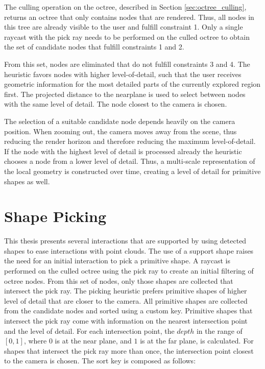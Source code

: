 \par

The culling operation on the octree, described in Section \ref{sec:octree_culling}, returns an octree that only contains nodes that are rendered. Thus, all nodes in this tree are already visible to the user and fulfill constraint 1. Only a single raycast with the pick ray needs to be performed on the culled octree to obtain the set of candidate nodes that fulfill constraints 1 and 2. 

\par

From this set, nodes are eliminated that do not fulfill constraints 3 and 4. The heuristic favors nodes with higher level-of-detail, such that the user receives geometric information for the most detailed parts of the currently explored region first. The projected distance to the nearplane is used to select between nodes with the same level of detail. The node closest to the camera is chosen. 

\par

The selection of a suitable candidate node depends heavily on the camera position. When zooming out, the camera moves away from the scene, thus reducing the render horizon and therefore reducing the maximum level-of-detail. If the node with the highest level of detail is processed already the heuristic chooses a node from a lower level of detail. Thus, a multi-scale representation of the local geometry is constructed over time, creating a level of detail for primitive shapes as well. 


\section{Shape Picking}
\label{sec:shapePicking}

This thesis presents several interactions that are supported by using detected shapes to ease interactions with point clouds. The use of a support shape raises the need for an initial interaction to pick a primitive shape. A raycast is performed on the culled octree using the pick ray to create an initial filtering of octree nodes. From this set of nodes, only those shapes are collected that intersect the pick ray. The picking heuristic prefers primitive shapes of higher level of detail that are closer to the camera. All primitive shapes are collected from the candidate nodes and sorted using a custom key. Primitive shapes that intersect the pick ray come with information on the nearest intersection point and the level of detail. For each intersection point, the $depth$ in the range of $[0,1]$, where $0$ is at the near plane, and $1$ is at the far plane, is calculated. For shapes that intersect the pick ray more than once, the intersection point closest to the camera is chosen. The sort key is composed as follows: 

